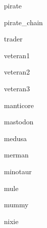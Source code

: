 \documentclass[letterpaper,serif]{module}
\begin{document}
\begin{newmonster}{pirate}\end{newmonster}

\begin{newmonster}{pirate_chain}\end{newmonster}

\begin{newmonster}{trader}\end{newmonster}

\begin{newmonster}{veteran1}\end{newmonster}

\begin{newmonster}{veteran2}\end{newmonster}

\begin{newmonster}{veteran3}\end{newmonster}

\begin{newmonster}{manticore}\end{newmonster}

\begin{newmonster}{mastodon}\end{newmonster}

\begin{newmonster}{medusa}\end{newmonster}

\begin{newmonster}{merman}\end{newmonster}

\begin{newmonster}{minotaur}\end{newmonster}

\begin{newmonster}{mule}\end{newmonster}

\begin{newmonster}{mummy}\end{newmonster}

\begin{newmonster}{nixie}\end{newmonster}
\end{document}
